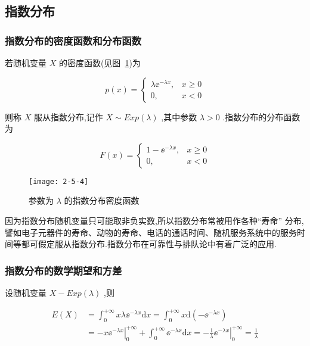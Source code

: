 \subsection{指数分布}

\subsubsection{指数分布的密度函数和分布函数}

若随机变量 $ X $ 的密度函数(见图~\ref{fig:2-5-4})为

\begin{equation}
p(x)=\left\{\begin{array}{ll}
{\lambda \ee ^{-\lambda x},} & {x \geqslant 0} \\ 
{0,} & {x<0}
\end{array}\right. \label{eq:2.5.8}
\end{equation}

则称 $ X $ 服从指数分布,记作 $ X \sim E x p(\lambda) $ ,其中参数 $ \lambda>0 $ .指数分布的分布函数为

\begin{equation}
F(x)=\left\{\begin{array}{ll}
{1-\ee ^{-\lambda x},} & {x \geqslant 0} \\ 
{0,} & {x<0}
\end{array}\right. \label{eq:2.5.9}
\end{equation}

\begin{figure}
	\centering
	\texttt{[image: 2-5-4]}
	\caption{参数为 $ \lambda $ 的指数分布密度函数}
	\label{fig:2-5-4}
\end{figure}

因为指数分布随机变量只可能取非负实数,所以指数分布常被用作各种“寿命”
分布,譬如电子元器件的寿命、动物的寿命、电话的通话时间、随机服务系统中的服务时间等都可假定服从指数分布.指数分布在可靠性与排队论中有着广泛的应用.

\subsubsection{指数分布的数学期望和方差}

设随机变量 $ X-E x p(\lambda) $ ,则

\[
\begin{aligned} 
E(X) &=\int_{0}^{+\infty} x \lambda \ee ^{-\lambda x} \mathrm{d} x=\int_{0}^{+\infty} x \mathrm{d}\left(-\ee ^{-\lambda x}\right) \\
&=-x\left.\ee ^{-\lambda x}\right|_{0} ^{+\infty}+\int_{0}^{+\infty} \ee ^{-\lambda x} \mathrm{d} x=-\frac{1}{\lambda}\left.\ee ^{-\lambda x}\right|_{0} ^{+\infty}=\frac{1}{\lambda} 
\end{aligned}
\]

